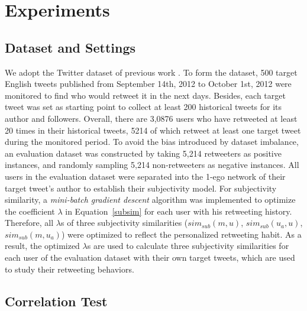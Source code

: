 \documentclass{acm_proc_article-sp}
\begin{document}
\section{Experiments}
\label{experiments}

\subsection{Dataset and Settings}
We adopt the Twitter dataset of previous work \cite{Luo:2013RMF}. 
To form the dataset, 500 target English tweets published from September 14th, 2012 to October 1st, 2012 were monitored to find who would retweet it in the next days. 
Besides, each target tweet was set as starting point to collect at least 200 historical tweets for its author and followers.
Overall, there are 3,0876 users who have retweeted at least 20 times in their historical tweets, 5214 of which retweet at least one target tweet during the monitored period. To avoid the bias introduced by dataset imbalance, an evaluation dataset was constructed by taking 5,214 retweeters as positive instances, and randomly sampling 5,214 non-retweeters as negative instances. All users in the evaluation dataset were separated into the 1-ego network of their target tweet's author to establish their subjectivity model. 
For subjectivity similarity, a \textit{mini-batch gradient descent} algorithm was implemented to optimize the coefficient $ \lambda $ in Equation~\ref{subsim} for each user with his retweeting history. Therefore, all $ \lambda $s of three subjectivity similarities ($ sim_{sub} \left( m,u \right) $, $ sim_{sub}\left( u_{a},u \right)  $, $ sim_{sub}\left( m,u_{a} \right)  $) were optimized to reflect the personalized retweeting habit. As a result, the optimized $ \lambda $s are used to calculate three subjectivity similarities for each user of the evaluation dataset with their own target tweets, which are used to study their retweeting behaviors.

\subsection{Correlation Test}
\end{document}
